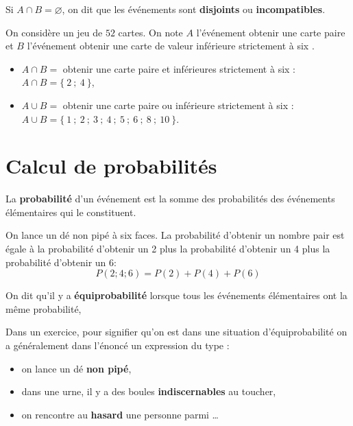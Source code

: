 \begin{rem}{}{}
   Si $A\cap B=\varnothing$, on dit que les événements sont \textbf{disjoints} ou \textbf{incompatibles}.
\end{rem}

\begin{ex}{}{}
   On considère un jeu de $52$ cartes. On note $A$ l'événement \og obtenir une carte paire \fg{} et $B$ l'événement \og obtenir une carte de valeur inférieure strictement à six \fg.
  \begin{itemize}
  \item[] $A\cap B=$ \og obtenir une carte paire et inférieures strictement à six \fg{} : $A \cap B=\{~2~;~4~\}$,
  \item[] $A \cup B=$ \og obtenir une carte paire ou inférieure strictement à six \fg{} : $A \cup B=\{~1~;~2~;~3~;~4~;~5~;~6~;~8~;~10~\}$.
  \end{itemize}
\end{ex}

\section{Calcul de probabilités} 

\begin{defi}{}{}
   La \textbf{probabilité} d'un événement est la somme des probabilités des événements élémentaires qui le constituent.
\end{defi}  

\begin{ex}{}{}
On lance un dé non pipé à six faces. La probabilité d'obtenir un nombre pair est égale à la probabilité d'obtenir un 2 plus la probabilité d'obtenir un 4 plus la probabilité d'obtenir un 6:
\[P({2;4;6})=P({2})+P({4})+P({6})\]
\end{ex}

\begin{defi}{}{}
On dit qu'il y a \textbf{équiprobabilité} lorsque tous les événements élémentaires ont la même probabilité,
\end{defi}  

\begin{rem}{}{}
  Dans un exercice, pour signifier qu'on est dans une situation d'équiprobabilité on a généralement dans l'énoncé un expression du type :
  \begin{itemize}
     \item  on lance un dé \textbf{non pipé},
     \item  dans une urne, il y a des boules \textbf{indiscernables} au toucher,
     \item  on rencontre au \textbf{hasard} une personne parmi \dots
  \end{itemize}
\end{rem}

